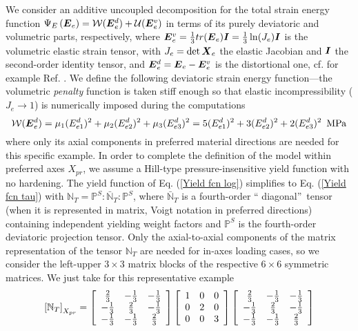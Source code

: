 \documentclass[preprint,review,12pt,sort&compress]{elsarticle}%
\renewcommand{\mathbf}[1]{\mbox{\boldmath $#1$ \unboldmath}  \!\!}
\begin{document}
We consider an additive uncoupled decomposition for the total strain energy
function $\Psi_{E}\left(  \mathbf{E}_{e}\right)  =\mathcal{W}(\mathbf{E}%
_{e}^{d})+\mathcal{U}(\mathbf{E}_{e}^{v})$ in terms of its purely deviatoric
and volumetric parts, respectively, where $\mathbf{E}_{e}^{v}=\frac{1}%
{3}tr(\mathbf{E}_{e})\mathbf{I}=\frac{1}{3}\ln(J_{e})\mathbf{I}$ is the
volumetric elastic strain tensor, with $J_{e}=\det\mathbf{X}_{e}$ the elastic
Jacobian and $\mathbf{I}$ the second-order identity tensor, and $\mathbf{E}%
_{e}^{d}=\mathbf{E}_{e}-\mathbf{E}_{e}^{v}$ is the distortional one, cf. for
example Ref. \cite{LatMonCM2014}. We define the following deviatoric strain
energy function---the volumetric \emph{penalty} function is taken stiff enough
so that elastic incompressibility ($J_{e}\rightarrow1$) is numerically imposed
during the computations%
\begin{equation}
\mathcal{W}(\mathbf{E}_{e}^{d})=\mu_{1}(E_{e1}^{d})^{2}+\mu_{2}(E_{e2}%
^{d})^{2}+\mu_{3}(E_{e3}^{d})^{2}=5(E_{e1}^{d})^{2}+3(E_{e2}^{d})^{2}%
+2(E_{e3}^{d})^{2}~%
\operatorname{MPa}%
\label{W}%
\end{equation}
where only its axial components in preferred material directions are needed
for this specific example. In order to complete the definition of the model
within preferred axes $X_{pr}$, we assume a Hill-type pressure-insensitive
yield function with no hardening. The yield function of Eq.
(\ref{Yield fcn log}) simplifies to Eq. (\ref{Yield fcn tau}) with
$\mathbb{N}_{T}=\mathbb{P}^{S}:\mathbb{\bar{N}}_{T}:\mathbb{P}^{S}$, where
$\mathbb{\bar{N}}_{T}$ is a fourth-order \textquotedblleft
diagonal\textquotedblright\ tensor (when it is represented in matrix, Voigt
notation in preferred directions) containing independent yielding weight
factors \cite{KojicBatheBook} and $\mathbb{P}^{S}$ is the fourth-order
deviatoric projection tensor. Only the axial-to-axial components of the matrix
representation of the tensor $\mathbb{N}_{T}$ are needed for in-axes loading
cases, so we consider the left-upper $3\times3$ matrix blocks of the
respective $6\times6$ symmetric matrices. We just take for this representative
example%
\begin{equation}
\left[  \mathbb{N}_{T}\right]  _{X_{pr}}=\left[
\begin{array}
[c]{ccc}%
\frac{2}{3} & -\frac{1}{3} & -\frac{1}{3}\\
-\frac{1}{3} & \frac{2}{3} & -\frac{1}{3}\\
-\frac{1}{3} & -\frac{1}{3} & \frac{2}{3}%
\end{array}
\right]  \left[
\begin{array}
[c]{ccc}%
1 & 0 & 0\\
0 & 2 & 0\\
0 & 0 & 3
\end{array}
\right]  \left[
\begin{array}
[c]{ccc}%
\frac{2}{3} & -\frac{1}{3} & -\frac{1}{3}\\
-\frac{1}{3} & \frac{2}{3} & -\frac{1}{3}\\
-\frac{1}{3} & -\frac{1}{3} & \frac{2}{3}%
\end{array}
\right]  \label{Nt}%
\end{equation}
\end{document}
